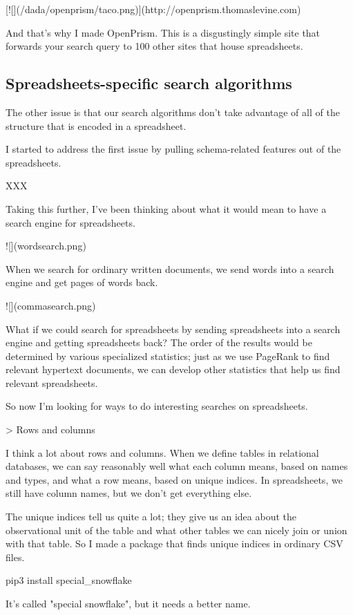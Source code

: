 \documentclass{acm_proc_article-sp}
\begin{document}
[![](/dada/openprism/taco.png)](http://openprism.thomaslevine.com)

And that's why I made OpenPrism. This is a disgustingly simple site that
forwards your search query to 100 other sites that house spreadsheets.

\subsection{Spreadsheets-specific search algorithms}
The other issue is that our search algorithms don't take advantage of all
of the structure that is encoded in a spreadsheet.

I started to address the first issue by pulling schema-related features out
of the spreadsheets.

XXX

Taking this further, I've been thinking
about what it would mean to have a search engine for spreadsheets.

![](wordsearch.png)

When we search for ordinary written documents, we send words into a search
engine and get pages of words back.

![](commasearch.png)

What if we could search for spreadsheets
by sending spreadsheets into a search engine and getting spreadsheets back?
The order of the results would be determined by various specialized statistics;
just as we use PageRank to find relevant hypertext documents, we can develop
other statistics that help us find relevant spreadsheets.

So now I'm looking for ways to do interesting searches on spreadsheets.

> Rows and columns

I think a lot about rows and columns. When we define tables in relational
databases, we can say reasonably well what each column means, based on
names and types, and what a row means, based on unique indices.
In spreadsheets, we still have column names, but we don't get everything
else.

The unique indices tell us quite a lot; they give us an idea about the
observational unit of the table and what other tables we can nicely
join or union with that table. So I made a package that finds unique
indices in ordinary CSV files.

    pip3 install special_snowflake

It's called "special snowflake", but it needs a better name.
\end{document}
